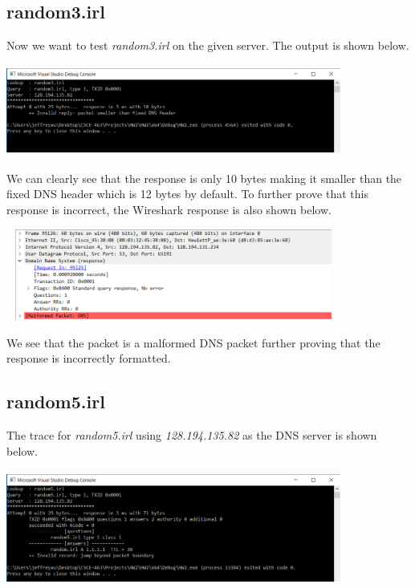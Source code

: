 \documentclass[12pt]{article}
\begin{document}
\subsection{random3.irl}

Now we want to test \emph{random3.irl} on the given server. The output is shown below.

\begin{center}
\includegraphics[width=11cm, height=3cm]{random3.irl}
\end{center}

We can clearly see that the response is only 10 bytes making it smaller than the fixed DNS header which is 12 bytes by default. To further prove that this response is incorrect, the Wireshark response is also shown below. 

\begin{center}
\includegraphics[width=11cm, height=3cm]{random3.irlWireShark}
\end{center}

We see that the packet is a malformed DNS packet further proving that the response is incorrectly formatted. 

\subsection{random5.irl}

The trace for \emph{random5.irl} using \emph{128.194.135.82} as the DNS server is shown below.

\begin{center}
\includegraphics[width=11cm, height=3.8cm]{random5.irl}
\end{center}
\end{document}
